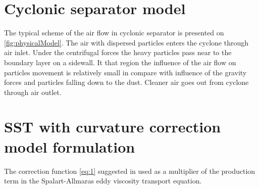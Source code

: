 \documentclass[a4paper]{jpconf}
\begin{document}
\section{Cyclonic separator model}
The typical scheme of the air flow in cyclonic separator is presented on \cref{fig:physicalModel}. The air with dispersed particles enters the cyclone through air inlet. Under the centrifugal forces the heavy particles pass near to the boundary layer on a sidewall. It that region the influence of the air flow on particles movement is relatively small in compare with influence of the gravity forces and particles falling down to the dust. Cleaner air goes out from cyclone through air outlet.
\section{SST with curvature correction model formulation}
\label{sec:model}
The correction function \eqref{eq:1} suggested in \cite{ShurSpallart} used as a multiplier of the production term in the Spalart-Allmaras eddy viscosity transport equation.
\end{document}
